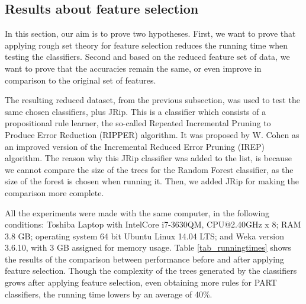 \documentclass{llncs}
\begin{document}
\subsection{Results about feature selection}
\label{subsec:RSTresults}

In this section, our aim is to prove two hypotheses. First, we want to
prove that applying rough set theory for feature selection reduces the
running time when testing the classifiers. Second and based on the
reduced feature set of data, we want to prove that the accuracies
remain the same, or even improve in comparison to the original set of
features. 

The resulting reduced dataset, from the previous subsection, was used to test the same chosen classifiers, plus JRip. This is a classifier which consists of a propositional rule learner, the so-called Repeated Incremental Pruning to Produce Error Reduction (RIPPER) algorithm. It was proposed by W. Cohen \cite{cohen1995fast} as an improved version of the Incremental Reduced Error Pruning (IREP) algorithm. The reason why this JRip classifier was added to the list, is because we cannot compare the size of the trees for the Random Forest classifier, as the size of the forest is chosen when running it. Then, we added JRip for making the comparison more complete.

All the experiments were made with the same computer, in the following
conditions: Toshiba Laptop with Intel\texttrademark  Core i7-3630QM,
CPU@2.40GHz x 8; RAM 3.8 GB; operating system 64 bit Ubuntu Linux 14.04 LTS; and Weka version 3.6.10, with 3 GB assigned for memory
usage. Table \ref{tab_runningtimes} shows the results of the
comparison between performance before and after applying feature
selection. Though the complexity of the trees generated by the
classifiers grows after applying feature selection, even obtaining
more rules for PART classifiers, the running time lowers by an average
of 40\%.  
\end{document}
